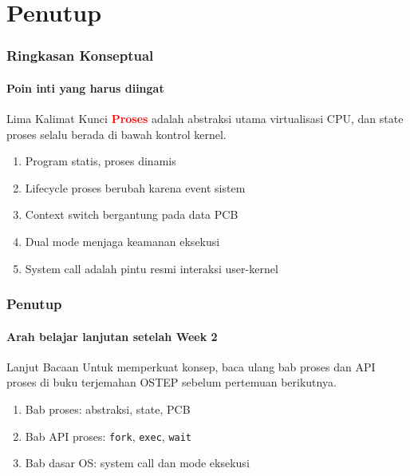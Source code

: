 \documentclass[t,aspectratio=169,xcolor=dvipsnames]{beamer}
\newcommand{\tem}[1]{\textbf{\textcolor{red}{#1}}}
\begin{document}
\section{Penutup}

\begin{frame}
    \frametitle{Ringkasan Konseptual}
    \framesubtitle{Poin inti yang harus diingat}
    \begin{alertblock}{Lima Kalimat Kunci}
        \tem{Proses} adalah abstraksi utama virtualisasi CPU, dan state proses selalu berada di bawah kontrol kernel.
    \end{alertblock}
    \vspace{0.1cm}
    \small
    \begin{enumerate}
        \item Program statis, proses dinamis
        \item Lifecycle proses berubah karena event sistem
        \item Context switch bergantung pada data PCB
        \item Dual mode menjaga keamanan eksekusi
        \item System call adalah pintu resmi interaksi user-kernel
    \end{enumerate}
\end{frame}

\begin{frame}
    \frametitle{Penutup}
    \framesubtitle{Arah belajar lanjutan setelah Week 2}
    \begin{exampleblock}{Lanjut Bacaan}
        Untuk memperkuat konsep, baca ulang bab proses dan API proses di buku terjemahan OSTEP sebelum pertemuan berikutnya.
    \end{exampleblock}
    \vspace{0.1cm}
    \small
   \begin{enumerate}
       \item Bab proses: abstraksi, state, PCB
       \item Bab API proses: \texttt{fork}, \texttt{exec}, \texttt{wait}
       \item Bab dasar OS: system call dan mode eksekusi
   \end{enumerate}
\end{frame}
\end{document}
